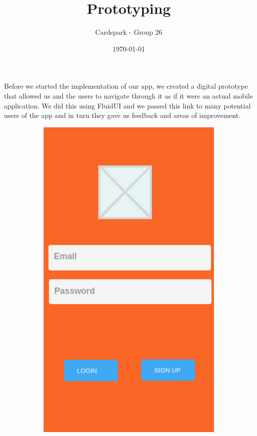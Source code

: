 \documentclass{article}
\begin{document}
\title{Prototyping}
\author{Cardspark - Group 26}
\date{\today}
\maketitle

Before we started the implementation of our app, we created a digital prototype that allowed us and the users to navigate through it as if it were an actual mobile application.  We did this using FluidUI and we passed this link to many potential users of the app and in turn they gave us feedback and areas of improvement.

\begin{figure}[ht]
	\centering
	\begin{subfigure}{}
	  \centering
			\includegraphics[scale=0.25]{fluidlogin.png}
	\end{subfigure}%
	\begin{subfigure}{}
	  \centering

\end{subfigure}
\end{figure}
\end{document}
